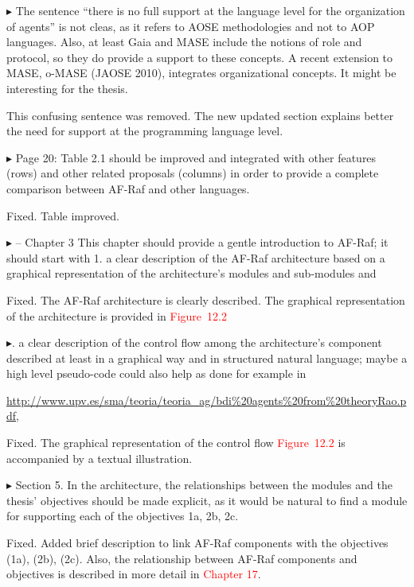 \documentclass{article}
\newcommand*\R[1]{\textcolor{red}{#1}} %
\newenvironment{them}%
  {\bigskip\noindent\begingroup\color{blue}$\blacktriangleright$\enspace}%
  {\endgroup\par}
\begin{document}
\begin{them}
The sentence ``there is no full support at the language level for the
organization of agents'' is not cleas, as it refers to AOSE methodologies and
not to AOP languages. Also, at least Gaia and MASE include the notions of role
and protocol, so they do provide a support to these concepts. A recent
extension to MASE, o-MASE (JAOSE 2010), integrates organizational concepts. It
might be interesting for the thesis.
\end{them}
This confusing sentence was removed. The new updated section explains better
the need for support at the programming language level. 

\begin{them}
Page 20:
Table 2.1 should be improved and integrated with other features (rows) and
other related proposals (columns) in order to provide a complete comparison
between AF-Raf and other languages.
\end{them}
Fixed. Table improved.

\begin{them}
-- Chapter 3
This chapter should provide a gentle introduction to AF-Raf; it should start
with 1. a clear description of the AF-Raf architecture based on a graphical
representation of the architecture's modules and sub-modules and
\end{them}
Fixed. The AF-Raf architecture is clearly described. The graphical
representation of the architecture is provided in \R{Figure~12.2}

\begin{them}
2. a clear description of the control flow among the architecture's component
described at least in a graphical way and in structured natural language; maybe
a high level pseudo-code could also help as done for example in

\url{http://www.upv.es/sma/teoria/teoria_ag/bdi\%20agents\%20from\%20theoryRao.pdf},
\end{them}
Fixed. The graphical representation of the control flow \R{Figure~12.2} is
accompanied by a textual illustration.

\begin{them}
Section 5.
In the architecture, the relationships between the modules and the thesis'
objectives should be made explicit, as it would be natural to find a module for
supporting each of the objectives 1a, 2b, 2c.
\end{them}
Fixed. Added brief description to link AF-Raf components with the objectives
(1a), (2b), (2c). Also, the relationship between AF-Raf components and
objectives is described in  more detail in \R{Chapter 17}.
\end{document}
